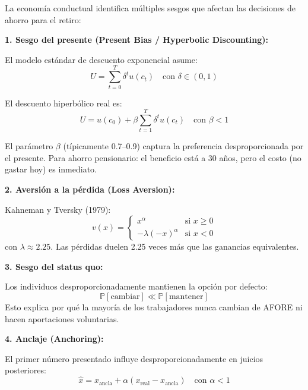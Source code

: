 \documentclass[11pt,a4paper]{report}
\begin{document}
\begin{tcolorbox}[colback=blue!5!white, colframe=blue!75!black, title=\textbf{Definici\'on Formal: Sesgos Cognitivos Relevantes}, breakable]
La econom\'ia conductual identifica m\'ultiples sesgos que afectan las decisiones de ahorro para el retiro:

\textbf{1. Sesgo del presente (Present Bias / Hyperbolic Discounting):}

El modelo est\'andar de descuento exponencial asume:
\[
  U = \sum_{t=0}^T \delta^t u(c_t) \quad \text{con } \delta \in (0,1)
\]

El descuento hiperb\'olico real es:
\[
  U = u(c_0) + \beta \sum_{t=1}^T \delta^t u(c_t) \quad \text{con } \beta < 1
\]

El par\'ametro $\beta$ (t\'ipicamente 0.7--0.9) captura la preferencia desproporcionada por el presente. Para ahorro pensionario: el beneficio est\'a a 30 a\~nos, pero el costo (no gastar hoy) es inmediato.

\textbf{2. Aversi\'on a la p\'erdida (Loss Aversion):}

Kahneman y Tversky (1979):
\[
  v(x) = \begin{cases}
    x^\alpha & \text{si } x \geq 0 \\
    -\lambda(-x)^\alpha & \text{si } x < 0
  \end{cases}
\]
con $\lambda \approx 2.25$. Las p\'erdidas duelen 2.25 veces m\'as que las ganancias equivalentes.

\textbf{3. Sesgo del status quo:}

Los individuos desproporcionadamente mantienen la opci\'on por defecto:
\[
  \mathbb{P}[\text{cambiar}] \ll \mathbb{P}[\text{mantener}]
\]
Esto explica por qu\'e la mayor\'ia de los trabajadores nunca cambian de AFORE ni hacen aportaciones voluntarias.

\textbf{4. Anclaje (Anchoring):}

El primer n\'umero presentado influye desproporcionadamente en juicios posteriores:
\[
  \hat{x} = x_{\text{ancla}} + \alpha(x_{\text{real}} - x_{\text{ancla}}) \quad \text{con } \alpha < 1
\]
\end{tcolorbox}
\end{document}
